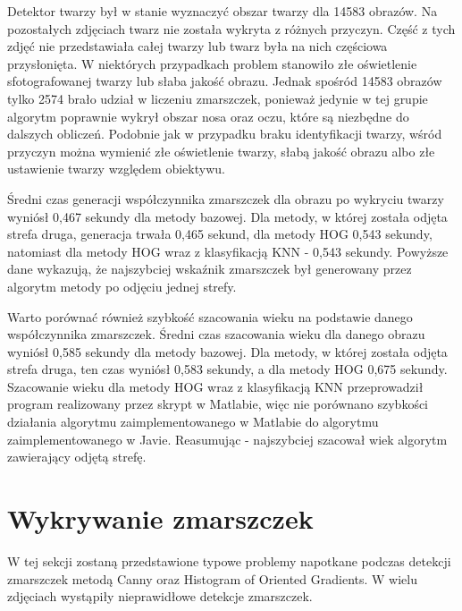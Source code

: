 \documentclass[a4paper,twoside,12pt]{book}
\begin{document}
    Detektor twarzy był w stanie wyznaczyć obszar twarzy dla 14583 obrazów.
    Na pozostałych zdjęciach twarz nie została wykryta z różnych przyczyn. Część z tych zdjęć nie przedstawiała całej
    twarzy lub twarz była na nich częściowa przysłonięta. W niektórych przypadkach problem stanowiło złe oświetlenie
    sfotografowanej twarzy lub słaba jakość obrazu.
    Jednak spośród 14583 obrazów tylko 2574 brało udział w liczeniu zmarszczek, ponieważ jedynie w tej grupie algorytm
    poprawnie wykrył obszar nosa oraz oczu, które są niezbędne do dalszych obliczeń. Podobnie jak w przypadku braku
    identyfikacji twarzy, wśród przyczyn można wymienić złe oświetlenie twarzy, słabą jakość obrazu albo złe
    ustawienie twarzy względem obiektywu.

    Średni czas generacji współczynnika zmarszczek dla obrazu po wykryciu twarzy wyniósł 0,467 sekundy dla metody
    bazowej.
    Dla metody, w której została odjęta strefa druga, generacja trwała 0,465 sekund,
    dla metody HOG 0,543 sekundy, natomiast dla metody HOG wraz z klasyfikacją KNN - 0,543 sekundy.
    Powyższe dane wykazują, że najszybciej wskaźnik zmarszczek był generowany przez algorytm metody
    po odjęciu jednej strefy.

    Warto porównać również szybkość szacowania wieku na podstawie danego współczynnika zmarszczek.
    Średni czas szacowania wieku dla danego obrazu wyniósł 0,585 sekundy dla metody bazowej.
    Dla metody, w której została
    odjęta strefa druga, ten czas wyniósł 0,583 sekundy, a dla metody HOG 0,675 sekundy.
    Szacowanie wieku dla metody HOG wraz z klasyfikacją KNN przeprowadził
    program realizowany przez skrypt w Matlabie, więc nie porównano szybkości działania
    algorytmu zaimplementowanego w Matlabie do algorytmu zaimplementowanego w Javie.
    Reasumując - najszybciej szacował wiek algorytm zawierający odjętą strefę.


    \section{Wykrywanie zmarszczek}\label{sec:wykrywanie-krawędzi-przez-detektor-canny}
    W tej sekcji zostaną przedstawione typowe problemy napotkane podczas detekcji zmarszczek metodą Canny oraz Histogram
    of Oriented Gradients.
    W wielu zdjęciach wystąpiły nieprawidłowe detekcje zmarszczek.
\end{document}
